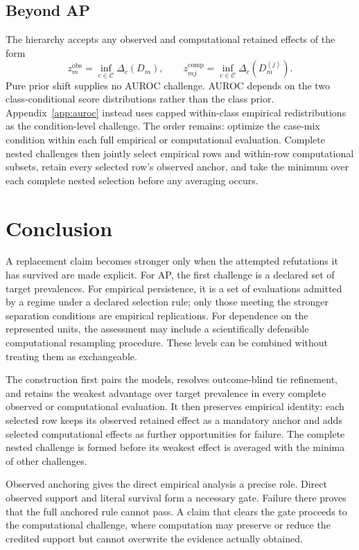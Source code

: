\documentclass[11pt]{article}
\newcommand{\CSet}{\mathcal{C}}
\theoremstyle{remark}
\begin{document}
\subsection{Beyond AP}

The hierarchy accepts any observed and computational retained effects of the
form
\[
z_m^{\mathrm{obs}}=\inf_{c\in\CSet}\Delta_c(D_m),
\qquad
z_{mj}^{\mathrm{comp}}=\inf_{c\in\CSet}\Delta_c(D_m^{(j)}).
\]
Pure prior shift supplies no AUROC challenge. AUROC depends on the two
class-conditional score distributions rather than the class prior.
Appendix~\ref{app:auroc} instead uses capped within-class empirical
redistributions as the condition-level challenge. The order remains: optimize
the case-mix condition within each full empirical or computational evaluation.
Complete nested challenges then jointly select empirical rows and within-row
computational subsets, retain every selected row's observed anchor, and take
the minimum over each complete nested selection before any averaging occurs.


\section{Conclusion}

A replacement claim becomes stronger only when the attempted refutations it
has survived are made explicit. For AP, the first challenge is a declared set
of target prevalences. For empirical persistence, it is a set of evaluations
admitted by a regime under a declared selection rule; only those meeting the
stronger separation conditions are empirical replications. For dependence on
the represented units, the assessment may include a scientifically defensible
computational resampling procedure. These levels can be combined without
treating them as exchangeable.

The construction first pairs the models, resolves outcome-blind tie refinement,
and retains the weakest advantage over target prevalence in every complete
observed or computational evaluation. It then preserves empirical identity:
each selected row keeps its observed retained effect as a mandatory anchor and
adds selected computational effects as further opportunities for failure. The
complete nested challenge is formed before its weakest effect is averaged with
the minima of other challenges.

Observed anchoring gives the direct empirical analysis a precise role. Direct
observed support and literal survival form a necessary gate. Failure there
proves that the full anchored rule cannot pass. A claim that clears the gate
proceeds to the computational challenge, where computation may preserve or
reduce the credited support but cannot overwrite the evidence actually
obtained.
\end{document}
